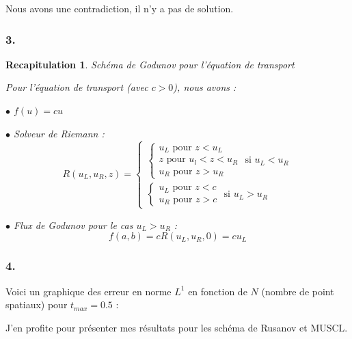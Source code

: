 \documentclass{article}
\newtheorem{recap}{Recapitulation}
\begin{document}
Nous avons une contradiction, il n'y a pas de solution.
\newline

\subsubsection*{3.}

\begin{recap}{Schéma de Godunov pour l'équation de transport}

Pour l'équation de transport (avec $c>0$), nous avons :

$\bullet$ $f(u) = c u$

$\bullet$ Solveur de Riemann :
\[ R(u_L, u_R, z) = \left\{ \begin{matrix}
	
	\left\{ \begin{matrix}
		u_L \text{ pour } z < u_L \\
		z \text{ pour } u_l < z < u_R \\
		u_R \text{ pour } z > u_R	
	\end{matrix} \right. \text{ si } u_L < u_R \\
	
	\left\{ \begin{matrix} 
		u_L \text{ pour } z < c \\
		u_R \text{ pour } z > c
	\end{matrix} \right. \text{ si } u_L > u_R

	\end{matrix} \right. \]

$\bullet$ Flux de Godunov pour le cas $u_L > u_R$ :
\[ f(a,b) = c R(u_L,u_R,0) = c u_L \]

\end{recap}

\subsubsection*{4.}

Voici un graphique des erreur en norme $L^1$ en fonction de $N$ (nombre de point spatiaux) pour $t_{max}=0.5$ :

J'en profite pour présenter mes résultats pour les schéma de Rusanov et MUSCL.
\end{document}
